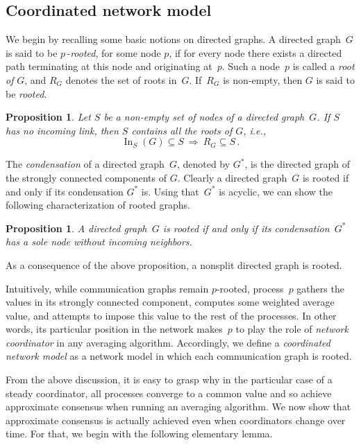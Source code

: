 \documentclass[a4paper]{article}
\theoremstyle{newthm}
\newtheorem{prop}[thm]{Proposition}
\DeclareMathOperator\In{In}
\begin{document}
\subsection{Coordinated network model}\label{sec:coordinated}

We begin by recalling some basic notions on directed graphs.
A directed graph~$G$ is said to be $p\,$-{\em rooted}, for some node $p$,
 	if for every node there exists a directed path  terminating at this node and originating at~$p$. 
Such a node~$p$ is called a {\em root of} $G$, and $R_G$ denotes the  set of roots in~$G$.
If~$R_G$ is non-empty, then $G$ is said to be {\em rooted}.

\begin{prop}\label{prop:rooted}
Let   $S$ be a non-empty set of nodes of a directed graph~$G$.
If $S$ has no incoming link, then $S$ contains all the roots of $G$, i.e., 
	$$ \In_S(G) \subseteq  S \ \Rightarrow \  R_G \subseteq S  \, .$$
\end{prop}

The {\em condensation\/} of a directed graph~$G$, denoted by $G^*$, is the directed graph of 
	the strongly connected components of $G$.
Clearly a directed graph~$G$ is rooted if and only if its condensation $G^*$ is.
Using that~$G^*$  is acyclic, we  can show the following characterization of rooted graphs.
 
\begin{prop}\label{prop:rootedbis}
A directed graph~$G$ is rooted if and only if its condensation~$G^*$ has a sole node without
        incoming neighbors.
\end{prop}
\noindent As a consequence of the above proposition, a nonsplit directed graph is rooted.




\medskip
Intuitively, while communication graphs remain $p$-rooted, process~$p$ gathers the 
	values in its strongly connected component, computes  some weighted average value,
	and attempts to impose this value to the rest of the processes.
In other words, its particular position in the network makes~$p$ 
	to play the role of {\em network coordinator\/} in  any averaging algorithm.
Accordingly, we define a {\em coordinated network model\/} as a network model 
	in which each communication graph is rooted.

From the above discussion, it is easy to grasp why in the particular 
	case of a steady coordinator, all processes converge to a common value and so achieve approximate 
	consensus when running an averaging algorithm.
We now  show that approximate consensus is actually achieved even when coordinators
	change over time. 
For that, we begin with the following elementary lemma.
\end{document}
